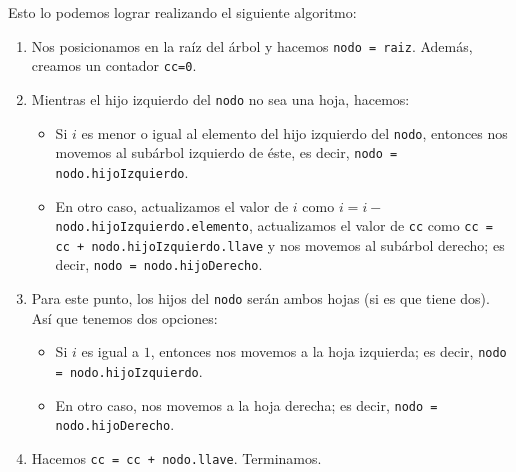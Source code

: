 \documentclass[letterpaper,11pt]{article}
\begin{document}
\begin{enumerate}
\begin{itemize}
        Esto lo podemos lograr realizando el siguiente algoritmo:
        \begin{enumerate}
            \item Nos posicionamos en la raíz del árbol y hacemos 
            \texttt{nodo = raiz}. Además, creamos un contador \texttt{cc=0}.

            \item Mientras el hijo izquierdo del \texttt{nodo} no sea una 
            hoja, hacemos:
            \begin{itemize}
                \item Si $i$ es menor o igual al elemento del hijo izquierdo 
                del \texttt{nodo}, entonces nos movemos al subárbol izquierdo 
                de éste, es decir, \texttt{nodo = nodo.hijoIzquierdo}.

                \item En otro caso, actualizamos el valor de $i$ como 
                $i = i -$ \texttt{nodo.hijoIzquierdo.elemento}, actualizamos 
                el valor de \texttt{cc} como 
                \texttt{cc = cc + nodo.hijoIzquierdo.llave} y nos movemos al
                subárbol derecho; es decir, \texttt{nodo = nodo.hijoDerecho}.
            \end{itemize}

            \item Para este punto, los hijos del \texttt{nodo} serán ambos 
            hojas (si es que tiene dos). Así que tenemos dos opciones:
            \begin{itemize}
                \item Si $i$ es igual a $1$, entonces nos movemos a la 
                hoja izquierda; es decir, \texttt{nodo = nodo.hijoIzquierdo}.

                \item En otro caso, nos movemos a la hoja derecha; es decir, 
                \texttt{nodo = nodo.hijoDerecho}.
            \end{itemize}

            \item Hacemos \texttt{cc = cc + nodo.llave}. Terminamos.
        \end{enumerate}


\end{itemize}
\end{enumerate}
\end{document}
